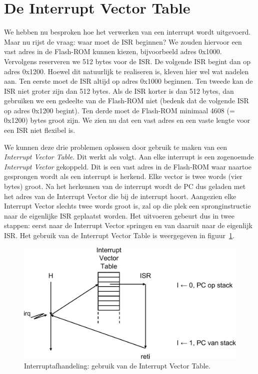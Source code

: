 \section{De Interrupt Vector Table}
We hebben nu besproken hoe het verwerken van een interrupt wordt uitgevoerd.
Maar nu rijst de vraag: waar moet de ISR beginnen? We zouden hiervoor een
vast adres in de Flash-ROM kunnen kiezen, bijvoorbeeld adres 0x1000.
Vervolgens reserveren we 512 bytes voor de ISR. De volgende ISR begint dan
op adres 0x1200. Hoewel dit natuurlijk te realiseren is, kleven hier wel
wat nadelen aan. Ten eerste moet de ISR altijd op adres 0x1000 beginnen.
Ten tweede kan de ISR niet groter zijn dan 512 bytes. Als de ISR korter is
dan 512 bytes, dan gebruiken we een gedeelte van de Flash-ROM niet (bedenk
dat de volgende ISR op adres 0x1200 begint). Ten derde moet de Flash-ROM
minimaal 4608 (= 0x1200) bytes groot zijn. We zien nu dat een vast adres
en een vaste lengte voor een ISR niet flexibel is.

We kunnen deze drie problemen oplossen door gebruik te maken van een
\textsl{Interrupt Vector Table}. Dit werkt als volgt. Aan elke interrupt is
een zogenoemde \textsl{Interrupt Vector} gekoppeld. Dit is een vast adres
in de Flash-ROM waar naartoe gesprongen wordt als een interrupt is herkend.
Elke vector is twee words (vier bytes) groot. Na het herkennen van de
interrupt wordt de PC dus geladen met het adres van de Interrupt Vector die
bij de interrupt hoort.
Aangezien elke Interrupt Vector slechts twee words groot is, zal op die
plek een spronginstructie naar de eigenlijke ISR geplaatst worden. Het
uitvoeren gebeurt dus in twee stappen: eerst naar de Interrupt Vector
springen en van daaruit naar de eigenlijk ISR. Het gebruik van de
Interrupt Vector Table is weergegeven in
figuur~\ref{fig:intinterruptdispatchwithvectortable}.

\begin{figure}[!ht]
\centering
\includegraphics[scale=\figscale]{images/intinterruptdispatchwithvectortable}
\caption{Interruptafhandeling: gebruik van de Interrupt Vector Table.}
\label{fig:intinterruptdispatchwithvectortable}
\end{figure}

